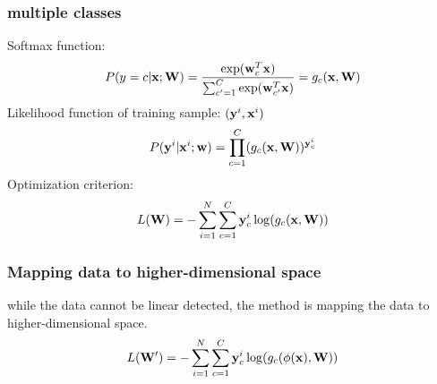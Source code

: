 \documentclass[12pt,a4paper]{article}
\begin{document}
\subsubsection*{multiple classes}
Softmax function:
$$
P(y=c|{\bf x;W}) = \frac{\exp({\bf w}^T_c{\bf x})}{\sum_{c'=1}^{C}\exp({\bf w}^T_{c'}{\bf x})} = g_c({\bf x,W})
$$
Likelihood function of training sample: $({\bf y}^i,{\bf x}^i)$
$$
P({\bf y}^i|{\bf x}^i;{\bf w}) = \prod_{c=1}^{C}(g_c({\bf x, W}))^{{\bf y}_c^i}
$$
Optimization criterion:
$$
L({\bf W}) = -\sum_{i=1}^{N}\sum_{c=1}^{C}{\bf y}^i_c\log(g_c({\bf x,W}))
$$
\subsubsection*{Mapping data to higher-dimensional space}
while the data cannot be linear detected, the method is mapping the data to higher-dimensional space.
$$
L({\bf W'}) = -\sum_{i=1}^{N}\sum_{c=1}^{C}{\bf y}^i_c\log(g_c({\bf \phi(x),W}))
$$
\end{document}
